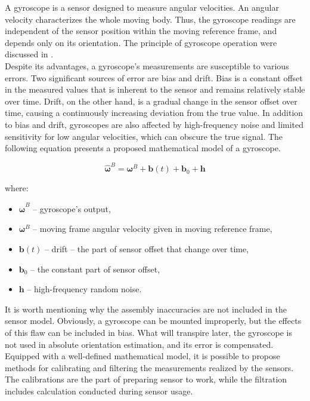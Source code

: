 A gyroscope is a sensor designed to measure angular velocities. An angular velocity characterizes the whole moving body. Thus, the gyroscope readings are independent of the sensor position within the moving reference frame, and depends only on its orientation. The principle of gyroscope operation were discussed in \cite{passaro2017gyroscope}.\\

Despite its advantages, a gyroscope's measurements are susceptible to various errors. Two significant sources of error are bias and drift. Bias is a constant offset in the measured values that is inherent to the sensor and remains relatively stable over time. Drift, on the other hand, is a gradual change in the sensor offset over time, causing a continuously increasing deviation from the true value. In addition to bias and drift, gyroscopes are also affected by high-frequency noise and limited sensitivity for low angular velocities, which can obscure the true signal. The following equation presents a proposed mathematical model of a gyroscope.

\begin{equation}
	\bm{\hat{\omega}}^B = \bm{\omega}^B + \bm{b}(t) + \bm{b}_0 + \bm{h}
	\label{gyro_model}
\end{equation}

where:
\begin{itemize}
	\item $\bm{\hat{\omega}}^B$ -- gyroscope's output,
	\item $\bm{\omega}^B$ -- moving frame angular velocity given in moving reference frame,
	\item $\bm{b}(t)$ -- drift -- the part of sensor offset that change over time,
	\item $\bm{b}_0$ -- the constant part of sensor offset,
	\item $\bm{h}$ -- high-frequency random noise.
\end{itemize}

It is worth mentioning why the assembly inaccuracies are not included in the sensor model. Obviously, a gyroscope can be mounted improperly, but the effects of this flaw can be included in bias. What will transpire later, the gyroscope is not used in absolute orientation estimation, and its error is compensated.\\

Equipped with a well-defined mathematical model, it is possible to propose methods for calibrating and filtering the measurements realized by the sensors. The calibrations are the part of preparing sensor to work, while the filtration includes calculation conducted during sensor usage.


